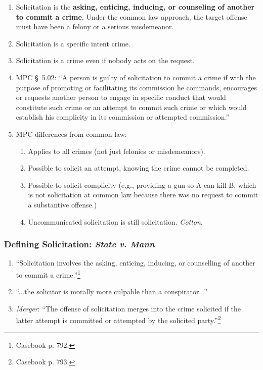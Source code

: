 \begin{enumerate}
    \item Solicitation is the \textbf{asking, enticing, inducing, or 
    counseling of another to commit a crime}. Under the common law approach, 
    the {target offense must have been a felony or a serious misdemeanor}.
    \item Solicitation is a specific intent crime.
    \item Solicitation is a crime even if nobody acts on the request.
    \item MPC \S\ 5.02: ``A person is guilty of solicitation to commit a crime 
    if with the purpose of promoting or facilitating its commission he 
    commands, encourages or requests another person to engage in specific 
    conduct that would constitute such crime or an attempt to commit such 
    crime or which would establish his complicity in its commission or 
    attempted commission.''
    \item MPC differences from common law:
    \begin{enumerate}
        \item Applies to all crimes (not just felonies or misdemeanors).
        \item Possible to solicit an attempt, knowing the crime cannot be completed.
        \item Possible to solicit complicity (e.g., providing a gun so A can 
        kill B, which is not solicitation at common law because there was no 
        request to commit a substantive offense.)
        \item Uncommunicated solicitation is still solicitation. \emph{Cotton}.
    \end{enumerate}
\end{enumerate}

\subsubsection{Defining Solicitation: \emph{State v. Mann}}

\begin{enumerate}
    \item ``Solicitation involves the asking, enticing, inducing, or 
    counselling of another to commit a crime.''\footnote{Casebook p. 792.}
    \item ``...the solicitor is morally more culpable than a conspirator...''
    \item \emph{Merger}: ``The offense of solicitation merges into the crime 
    solicited if the latter attempt is committed or attempted by the solicited 
    party.''\footnote{Casebook p. 793.}
\end{enumerate}

